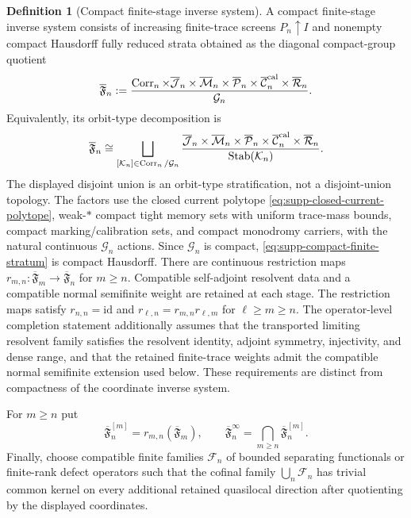 \documentclass[11pt]{article}
\theoremstyle{definition}
\newtheorem{definition}[definition]{Definition}
\theoremstyle{remark}
\theoremstyle{definition}
\theoremstyle{remark}
\newcommand{\id}{\mathrm{id}}
\newcommand{\Corr}{\operatorname{Corr}}
\newcommand{\Stab}{\operatorname{Stab}}
\begin{document}
\begin{definition}[Compact finite-stage inverse system]
\label{def:supp-compact-fibre-system}
A compact finite-stage inverse system consists of increasing finite-trace screens
$P_n\uparrow I$ and nonempty compact Hausdorff fully reduced strata obtained as
the diagonal compact-group quotient
\begin{equation}
 \overline{\mathfrak F}_n
 :=\frac{
 \Corr_n\times\overline{\mathcal J}_n\times\overline{\mathcal M}_n
 \times\overline{\mathcal P}_n\times\overline{\mathcal C}_n^{\rm cal}
 \times\overline{\mathcal R}_n
 }{\mathcal G_n}.
 \label{eq:supp-compact-finite-stratum}
\end{equation}
Equivalently, its orbit-type decomposition is
\[
 \overline{\mathfrak F}_n
 \cong
 \bigsqcup_{[\mathcal K_n]\in\Corr_n/\mathcal G_n}
 \frac{
 \overline{\mathcal J}_n\times\overline{\mathcal M}_n
 \times\overline{\mathcal P}_n\times\overline{\mathcal C}_n^{\rm cal}
 \times\overline{\mathcal R}_n
 }{\Stab(\mathcal K_n)}.
\]
The displayed disjoint union is an orbit-type stratification, not a disjoint-union
topology.  The factors use the closed current polytope
\eqref{eq:supp-closed-current-polytope}, weak-$*$ compact tight memory sets with
uniform trace-mass bounds, compact marking/calibration sets, and compact monodromy
carriers, with the natural continuous $\mathcal G_n$ actions.  Since
$\mathcal G_n$ is compact, \eqref{eq:supp-compact-finite-stratum} is compact
Hausdorff.  There are continuous restriction maps
$r_{m,n}:\overline{\mathfrak F}_m\to\overline{\mathfrak F}_n$ for $m\ge n$.
Compatible self-adjoint resolvent data and a compatible normal semifinite weight
are retained at each stage.  The restriction maps satisfy
$r_{n,n}=\id$ and $r_{\ell,n}=r_{m,n}r_{\ell,m}$ for $\ell\ge m\ge n$.
The operator-level completion statement additionally assumes that the
transported limiting resolvent family satisfies the resolvent identity,
adjoint symmetry, injectivity, and dense range, and that the retained
finite-trace weights admit the compatible normal semifinite extension used
below.  These requirements are distinct from compactness of the coordinate
inverse system.

For $m\ge n$ put
\begin{equation}
 \overline{\mathfrak F}_n^{[m]}
 =r_{m,n}(\overline{\mathfrak F}_m),
 \qquad
 \overline{\mathfrak F}_n^{\infty}
 =\bigcap_{m\ge n}\overline{\mathfrak F}_n^{[m]}.
 \label{eq:supp-stable-fibre-images}
\end{equation}
Finally, choose compatible finite families $\mathscr F_n$ of bounded separating
functionals or finite-rank defect operators such that the cofinal family
$\bigcup_n\mathscr F_n$ has trivial common kernel on every additional retained
quasilocal direction after quotienting by the displayed coordinates.
\end{definition}
\end{document}
